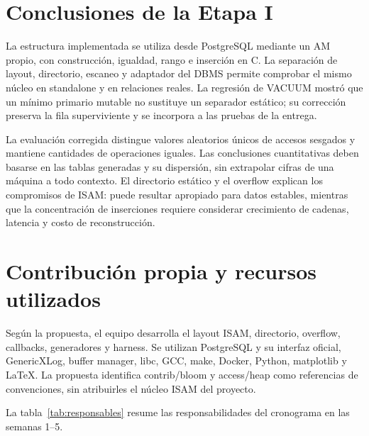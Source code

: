 \documentclass[11pt,a4paper]{article}
\begin{document}
\section{Conclusiones de la Etapa I}

La estructura implementada se utiliza desde PostgreSQL mediante un AM propio,
con construcción, igualdad, rango e inserción en C. La separación de layout,
directorio, escaneo y adaptador del DBMS permite comprobar el mismo núcleo en
standalone y en relaciones reales. La regresión de VACUUM mostró que un mínimo
primario mutable no sustituye un separador estático; su corrección preserva la
fila superviviente y se incorpora a las pruebas de la entrega.

La evaluación corregida distingue valores aleatorios únicos de accesos sesgados
y mantiene cantidades de operaciones iguales. Las conclusiones cuantitativas
deben basarse en las tablas generadas y su dispersión, sin extrapolar cifras de
una máquina a todo contexto. El directorio estático y el overflow explican los
compromisos de ISAM: puede resultar apropiado para datos estables, mientras que
la concentración de inserciones requiere considerar crecimiento de cadenas,
latencia y costo de reconstrucción.

\section*{Contribución propia y recursos utilizados}
{}

Según la propuesta, el equipo desarrolla el layout ISAM, directorio, overflow,
callbacks, generadores y harness. Se utilizan PostgreSQL y su interfaz oficial,
GenericXLog, buffer manager, libc, GCC, make, Docker, Python, matplotlib y LaTeX.
La propuesta identifica contrib/bloom y access/heap como referencias de
convenciones, sin atribuirles el núcleo ISAM del proyecto.

La tabla~\ref{tab:responsables} resume las responsabilidades del cronograma en
las semanas 1--5.
\end{document}
